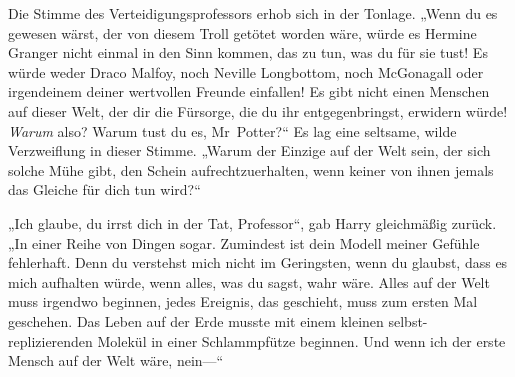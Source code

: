 Die Stimme des Verteidigungsprofessors erhob sich in der Tonlage. „Wenn du es gewesen wärst, der von diesem Troll getötet worden wäre, würde es Hermine Granger nicht einmal in den Sinn kommen, das zu tun, was du für sie tust! Es würde weder Draco Malfoy, noch Neville Longbottom, noch McGonagall oder irgendeinem deiner wertvollen Freunde einfallen! Es gibt nicht einen Menschen auf dieser Welt, der dir die Fürsorge, die du ihr entgegenbringst, erwidern würde! \emph{Warum} also? Warum tust du es, Mr~Potter?“
Es lag eine seltsame, wilde Verzweiflung in dieser Stimme.
„Warum der Einzige auf der Welt sein, der sich solche Mühe gibt, den Schein aufrechtzuerhalten, wenn keiner von ihnen jemals das Gleiche für dich tun wird?“

„Ich glaube, du irrst dich in der Tat, Professor“, gab Harry gleichmäßig zurück. „In einer Reihe von Dingen sogar. Zumindest ist dein Modell meiner Gefühle fehlerhaft. Denn du verstehst mich nicht im Geringsten, wenn du glaubst, dass es mich aufhalten würde, wenn alles, was du sagst, wahr wäre. Alles auf der Welt muss irgendwo beginnen, jedes Ereignis, das geschieht, muss zum ersten Mal geschehen. Das Leben auf der Erde musste mit einem kleinen selbst-replizierenden Molekül in einer Schlammpfütze beginnen. Und wenn ich der erste Mensch auf der Welt wäre, nein—“


